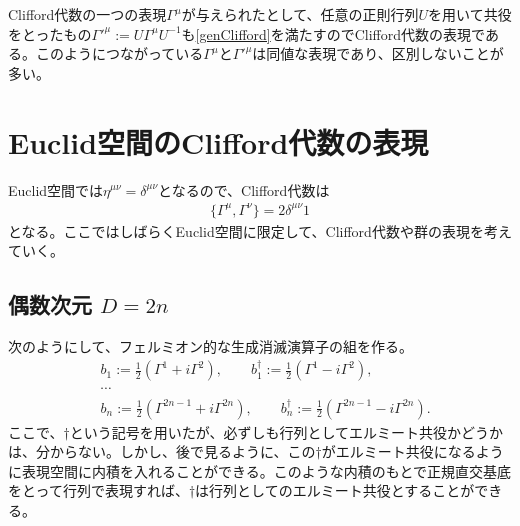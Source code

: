 \documentclass[12pt,a4paper]{jlreq}
\begin{document}
Clifford代数の一つの表現$\Gamma^{\mu}$が与えられたとして、任意の正則行列$U$を用いて共役をとったもの$\Gamma'^{\mu}:=U\Gamma^{\mu}U^{-1}$も\eqref{genClifford}を満たすのでClifford代数の表現である。このようにつながっている$\Gamma^{\mu}$と$\Gamma'^{\mu}$は同値な表現であり、区別しないことが多い。

\section{Euclid空間のClifford代数の表現}
Euclid空間では$\eta^{\mu\nu}=\delta^{\mu\nu}$となるので、Clifford代数は
\begin{align}
  \{\Gamma^{\mu},\Gamma^{\nu}\}=2\delta^{\mu\nu} 1
  \label{Clifford}
\end{align}
となる。ここではしばらくEuclid空間に限定して、Clifford代数や群の表現を考えていく。

\subsection{偶数次元 $D=2n$}
次のようにして、フェルミオン的な生成消滅演算子の組を作る。
\begin{equation}
\begin{aligned}
  &b_1:=\frac12 (\Gamma^1+i\Gamma^2),\qquad
  b_1^{\dag}:=\frac12 (\Gamma^1-i\Gamma^2),\\
  &\cdots\\
  &b_n:=\frac12(\Gamma^{2n-1}+i\Gamma^{2n}),\qquad
  b_n^{\dag}:=\frac12(\Gamma^{2n-1}-i\Gamma^{2n}).
\end{aligned}  
\label{creani}
\end{equation}
ここで、$\dag$という記号を用いたが、必ずしも行列としてエルミート共役かどうかは、分からない。しかし、後で見るように、この$\dag$がエルミート共役になるように表現空間に内積を入れることができる。このような内積のもとで正規直交基底をとって行列で表現すれば、$\dag$は行列としてのエルミート共役とすることができる。
\end{document}
